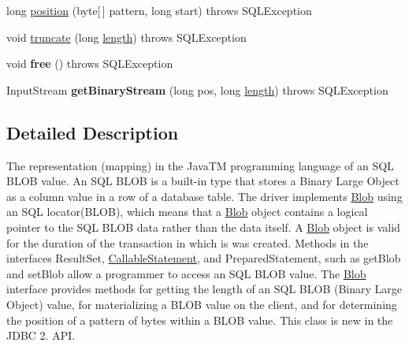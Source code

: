 \begin{DoxyCompactItemize}
\item 
long \mbox{\hyperlink{classcom_1_1mysql_1_1cj_1_1jdbc_1_1_blob_from_locator_ac653f12b01e1b120afacc0e9f0efa4e4}{position}} (byte\mbox{[}$\,$\mbox{]} pattern, long start)  throws S\+Q\+L\+Exception 
\item 
void \mbox{\hyperlink{classcom_1_1mysql_1_1cj_1_1jdbc_1_1_blob_from_locator_aa3292b305786ffdcaf63ccaab6ff620b}{truncate}} (long \mbox{\hyperlink{classcom_1_1mysql_1_1cj_1_1jdbc_1_1_blob_from_locator_a6eea7dd5b29ebcd066beac855648fe35}{length}})  throws S\+Q\+L\+Exception 
\item 
\mbox{\label{classcom_1_1mysql_1_1cj_1_1jdbc_1_1_blob_from_locator_a88c2c807229112622b1d1369d6e2d682}} 
void {\bfseries free} ()  throws S\+Q\+L\+Exception 
\item 
\mbox{\label{classcom_1_1mysql_1_1cj_1_1jdbc_1_1_blob_from_locator_aa77f948ff1858ec329525385e63e4e46}} 
Input\+Stream {\bfseries get\+Binary\+Stream} (long pos, long \mbox{\hyperlink{classcom_1_1mysql_1_1cj_1_1jdbc_1_1_blob_from_locator_a6eea7dd5b29ebcd066beac855648fe35}{length}})  throws S\+Q\+L\+Exception 
\end{DoxyCompactItemize}


\subsection{Detailed Description}
The representation (mapping) in the Java\+TM programming language of an S\+QL B\+L\+OB value. An S\+QL B\+L\+OB is a built-\/in type that stores a Binary Large Object as a column value in a row of a database table. The driver implements \mbox{\hyperlink{classcom_1_1mysql_1_1cj_1_1jdbc_1_1_blob}{Blob}} using an S\+QL locator(\+B\+L\+O\+B), which means that a \mbox{\hyperlink{classcom_1_1mysql_1_1cj_1_1jdbc_1_1_blob}{Blob}} object contains a logical pointer to the S\+QL B\+L\+OB data rather than the data itself. A \mbox{\hyperlink{classcom_1_1mysql_1_1cj_1_1jdbc_1_1_blob}{Blob}} object is valid for the duration of the transaction in which is was created. Methods in the interfaces Result\+Set, \mbox{\hyperlink{classcom_1_1mysql_1_1cj_1_1jdbc_1_1_callable_statement}{Callable\+Statement}}, and Prepared\+Statement, such as get\+Blob and set\+Blob allow a programmer to access an S\+QL B\+L\+OB value. The \mbox{\hyperlink{classcom_1_1mysql_1_1cj_1_1jdbc_1_1_blob}{Blob}} interface provides methods for getting the length of an S\+QL B\+L\+OB (Binary Large Object) value, for materializing a B\+L\+OB value on the client, and for determining the position of a pattern of bytes within a B\+L\+OB value. This class is new in the J\+D\+BC 2. A\+PI. 

